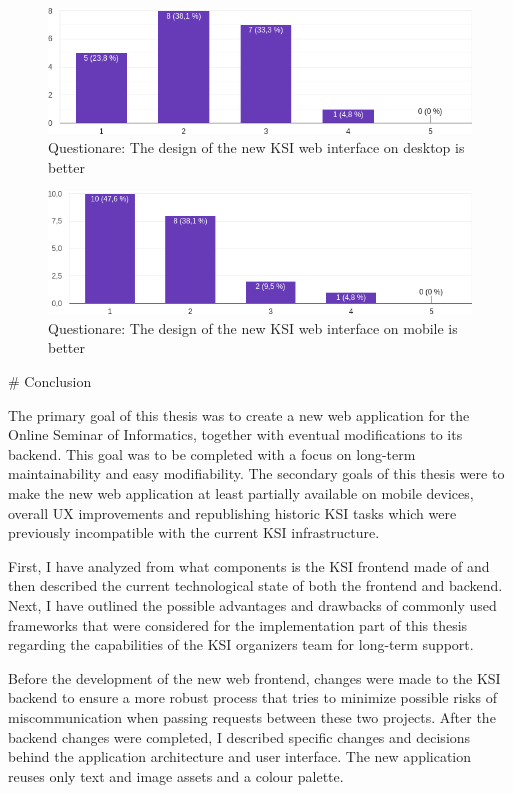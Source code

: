 \documentclass[
  digital, %
  oneside, %
  lof,     %
  nolot,     %
]{fithesis4}
\begin{document}
{\begin{figure}
\includegraphics[width=\textwidth]{assets/img/questionare/pc-ui}
\caption{Questionare: The design of the new KSI web interface on desktop is better}
\label{fig:q-ui-pc}
\end{figure}

\begin{figure}
\includegraphics[width=\textwidth]{assets/img/questionare/mobile-ui}
\caption{Questionare: The design of the new KSI web interface on mobile is better}
\label{fig:q-ui-mobile}
\end{figure}

# Conclusion

The primary goal of this thesis was to create a new web application for the Online Seminar of Informatics, together with eventual modifications to its backend. This goal was to be completed with a focus on long-term maintainability and easy modifiability. The secondary goals of this thesis were to make the new web application at least partially available on mobile devices, overall UX improvements and republishing historic KSI tasks which were previously incompatible with the current KSI infrastructure.

First, I have analyzed from what components is the KSI frontend made of and then described the current technological state of both the frontend and backend. Next, I have outlined the possible advantages and drawbacks of commonly used frameworks that were considered for the implementation part of this thesis regarding the capabilities of the KSI organizers team for long-term support.

Before the development of the new web frontend, changes were made to the KSI backend to ensure a more robust process that tries to minimize possible risks of miscommunication when passing requests between these two projects. After the backend changes were completed, I described specific changes and decisions behind the application architecture and user interface. The new application reuses only text and image assets and a colour palette.

}
\end{document}
